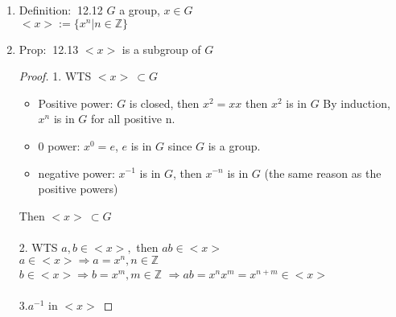 \documentclass[12pt]{article}
\newcommand{\defi}{{\color{blue} Definition: $\ $}}
\newcommand{\prop}{{\color{blue} Prop: $\ $}}
\begin{document}
\begin{enumerate}
\begin{enumerate}
\begin{itemize}
            \item $H$ is subset of $G$
            \item $H$ closed under operation
        \end{itemize} 
        \begin{proof}
            $x \in H$ then we have to take $x,x^1,x^2 \dots ,x^n\dots$
            since we are closed under operation.\\
            $H$ is finite $\Rightarrow \exists m,n$ s.t. $x^n=x^m$\\
            Suppose $n \ge m, x^n=x^m$,\\
            $$x^n = x^mx^{n-m} = x^m$$
            $$\Rightarrow x^mx^{n-m} = x^me$$
            $$\Rightarrow x^{n-m} = e$$
            Then it guarantees that there is identity in $H$
        \end{proof}

        \item \defi 12.12 $G$ a group, $x\in G$\\
        $<x>:=\{x^n|n\in \mathbb{Z}\}$
        
        \item \prop 12.13 $<x>$ is a subgroup of $G$
        \begin{proof}
            1. WTS $<x>\ \subset G$ 
            \begin{itemize}
                \item Positive power: $G$ is closed, then $x^2 = xx$ then $x^2$ is in $G$ By induction, $x^n$ is in $G$ for all positive n.
                \item 0 power: $x^0 = e$, $e$ is in $G$ since $G$ is a group.
                \item negative power: $x^{-1}$ is in $G$, then $x^{-n}$ is in $G$ (the same reason as the positive powers)
            \end{itemize}
            Then $<x> \ \subset G$ \\ \\
            2. WTS $a,b \in <x>,$ then $ab \in <x>$\\
            $a \in <x> \Rightarrow a = x^n, n \in \mathbb{Z}$\\
            $b \in <x> \Rightarrow b = x^m, m \in \mathbb{Z}$
            $\Rightarrow ab = x^nx^m = x^{n+m} \in <x>$\\ \\
            3.$a^{-1}$ in $<x>$
        \end{proof}
    \end{enumerate}


\end{enumerate}
\end{document}
